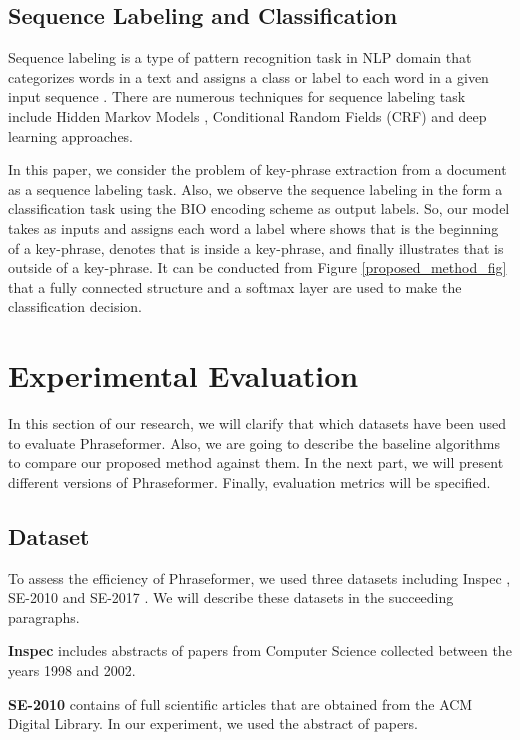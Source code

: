 \documentclass[review,3p]{elsarticle}
\begin{document}
\subsection{Sequence Labeling and Classification}
Sequence labeling is a type of pattern recognition task in NLP domain that categorizes words in a text and assigns a class or label to each word in a given input sequence \cite{he2020survey, akhundov2018sequence}. There are numerous techniques for sequence  labeling  task include Hidden  Markov  Models \cite{kupiec1992robust},  Conditional Random Fields (CRF) \cite{lafferty2001conditional} and deep learning approaches.

In  this  paper, we consider the problem of key-phrase extraction from a document as a sequence labeling task.  Also, we observe the sequence labeling in the form a classification task using the BIO encoding scheme as output labels.
So, our model takes  as inputs and assigns each word a label  where  shows that  is the beginning of a key-phrase,  denotes that  is inside a key-phrase, and finally  illustrates that  is outside of a key-phrase. It can be conducted from Figure \ref{proposed_method_fig} that
a fully connected structure and a softmax layer are used to make the classification decision.


\section{Experimental Evaluation}\label{experiments}
In this section of our research, we will clarify that which datasets have been used to evaluate Phraseformer. Also, we are going to describe the baseline algorithms to compare our proposed method against them. In the next part, we will present different versions of Phraseformer. Finally, evaluation metrics will be specified.

\subsection{Dataset}
To assess the efficiency of Phraseformer, we used three datasets including Inspec \cite{hulth2003improved}, SE-2010 \cite{kim2010semeval} and SE-2017 \cite{augenstein2017semeval}. We will describe these datasets in the succeeding paragraphs.

\textbf{Inspec} includes abstracts of papers from Computer Science collected between the years 1998 and 2002.

\textbf{SE-2010} contains of full scientific articles that are obtained from the ACM Digital Library. In our experiment, we used the abstract of papers.
\end{document}
